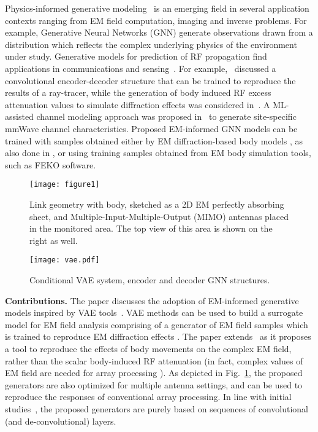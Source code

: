 Physics-informed generative modeling~\cite{generative_mag} is an emerging field in several application contexts ranging from EM field computation, imaging and inverse problems. For example, Generative Neural Networks (GNN) generate observations drawn from a distribution which reflects the complex underlying physics of the environment under study. Generative models for prediction of RF propagation find applications in communications and sensing~\cite{ss}. For example,~\cite{phyindoor} discussed a convolutional encoder-decoder structure that can be trained to reproduce the results of a ray-tracer, while the generation of body induced RF excess attenuation values to simulate diffraction effects was considered in~\cite{generation}. A ML-assisted channel modeling approach was proposed in~\cite{hybphydata} to generate site-specific mmWave channel characteristics. Proposed EM-informed GNN models can be trained with samples obtained either by EM diffraction-based body models \cite{plouhinec-2019,rampa-2017,rampa-2022a,eleryan-2011}, as also done in \cite{generation}, or using training samples obtained from EM body simulation tools, such as FEKO\textsuperscript{\textregistered} software. 

\begin{figure}
\centering \texttt{[image: figure1]} \protect\caption{\label{intro} Link geometry with body, sketched as a 2D EM perfectly absorbing sheet, and Multiple-Input-Multiple-Output (MIMO) antennas placed in the monitored area. The top view of this area is shown on the right as well.}
\end{figure}

\begin{figure}
\centering \texttt{[image: vae.pdf]} \protect\caption{\label{vae_gan} Conditional VAE system, encoder and decoder GNN structures.}
\end{figure}

\textbf{Contributions.} The paper discusses the adoption of EM-informed generative models inspired by VAE tools~\cite{bond,generation}. VAE methods can be used to build a surrogate model for EM field analysis comprising of a generator of EM field samples which is trained to reproduce EM diffraction effects \cite{rampa-2017,rampa-2022a,eleryan-2011}. The paper extends~\cite{generation} as it proposes a tool to reproduce the effects of body movements on the complex EM field, rather than the scalar body-induced RF attenuation (in fact, complex values of EM field are needed for array processing \cite{mimo}). As depicted in Fig.~\ref{intro}, the proposed generators are also optimized for multiple antenna settings, and can be used to reproduce the responses of conventional array processing. In line with initial studies~\cite{generative_mag,dibarba,baldan}, the proposed generators are purely based on sequences of convolutional (and de-convolutional) layers.

